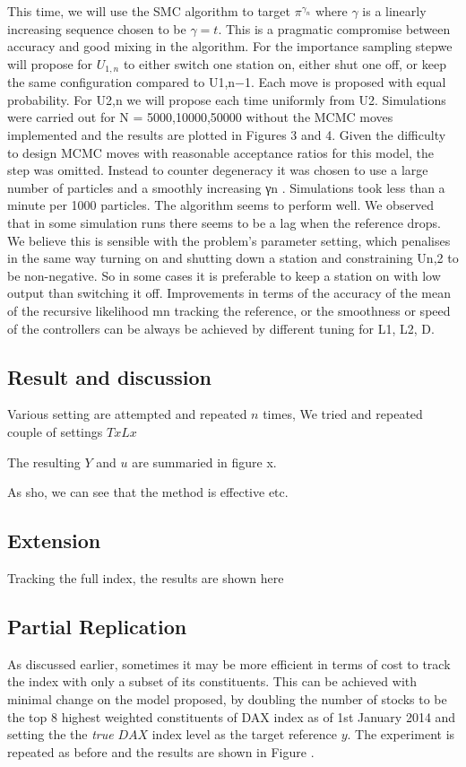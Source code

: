 This time, we will use the SMC algorithm to target $\pi^{\gamma_n}$ where $\gamma$ is a linearly increasing sequence chosen to be $\gamma=t$. This is a pragmatic compromise between accuracy and good mixing in the algorithm. For the importance sampling stepwe will propose for $U_{1,n}$ to either switch one station on, either shut one off, or keep the same configuration compared to U1,n−1. Each move is proposed with equal probability. For U2,n we will propose each time uniformly from U2. Simulations were carried out for N = 5000,10000,50000 without the MCMC moves implemented and the results are plotted in Figures 3 and 4. Given the difficulty to design MCMC moves with reasonable acceptance ratios for this model, the step was omitted. Instead to counter degeneracy it was chosen to use a large number of particles and a smoothly increasing γn . Simulations took less than a minute per 1000 particles.
The algorithm seems to perform well. We observed that in some simulation runs there seems to be a lag when the reference drops. We believe this is sensible with the problem’s parameter setting, which penalises in the same way turning on and shutting down a station and constraining Un,2 to be non-negative. So in some cases it is preferable to keep a station on with low output than switching it off. Improvements in terms of the accuracy of the mean of the recursive likelihood mn tracking the reference, or the smoothness or speed of the controllers can be always be achieved by different tuning for L1, L2, D.
 
\subsection{Result and discussion}
Various setting are attempted and repeated $n$ times, We tried and repeated couple of settings $T x L x $
 
The resulting $Y$ and $u$ are summaried in figure x.
 
As sho, we can see that the method is effective etc.
 
\subsection{Extension}
Tracking the full index, the results are shown here
 
\subsection{Partial Replication}
As discussed earlier, sometimes it may be more efficient in terms of cost to track the index with only a subset of its constituents. This can be achieved with minimal change on the model proposed, by doubling the number of stocks to be the top $8$ highest weighted constituents of DAX index as of 1st January 2014 and setting the the \emph{true} $DAX$ index level as the target reference $y$. The experiment is repeated as before and the results are shown in Figure .
 
